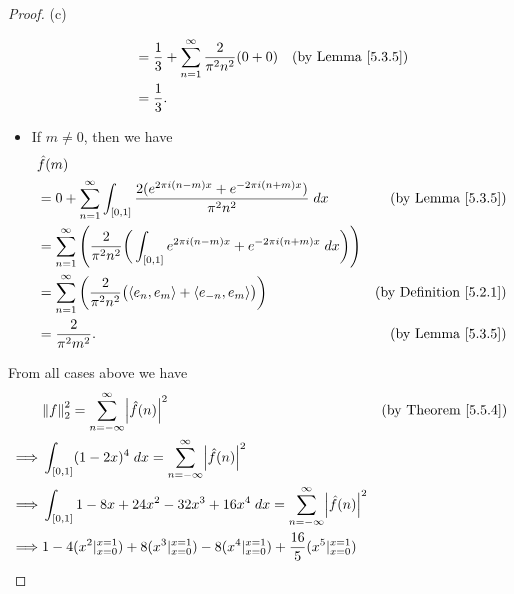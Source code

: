 \begin{proof}{(c)}
\begin{itemize}
\begin{align*}
                             & = \frac{1}{3} + \sum_{n = 1}^\infty \frac{2}{\pi^2 n^2} (0 + 0)                                                                       & \text{(by Lemma \ref{5.3.5})}      \\
                             & = \frac{1}{3}.
              \end{align*}
        \item If \(m \neq 0\), then we have
              \begin{align*}
                   & \hat{f}(m)                                                                                                                                                                 \\
                   & = 0 + \sum_{n = 1}^\infty \int_{[0, 1]} \frac{2 (e^{2 \pi i (n - m) x} + e^{- 2 \pi i (n + m) x})}{\pi^2 n^2} \; dx                   & \text{(by Lemma \ref{5.3.5})}      \\
                   & = \sum_{n = 1}^\infty \Bigg(\frac{2}{\pi^2 n^2} \bigg(\int_{[0, 1]} e^{2 \pi i (n - m) x} + e^{- 2 \pi i (n + m) x} \; dx\bigg)\Bigg)                                      \\
                   & = \sum_{n = 1}^\infty \bigg(\frac{2}{\pi^2 n^2} \big(\inner*{e_n, e_m} + \inner*{e_{-n}, e_m}\big)\bigg)                              & \text{(by Definition \ref{5.2.1})} \\
                   & = \frac{2}{\pi^2 m^2}.                                                                                                                & \text{(by Lemma \ref{5.3.5})}
              \end{align*}
    \end{itemize}
    From all cases above we have
    \begin{align*}
                 & \norm*{f}_2^2 = \sum_{n = -\infty}^\infty \abs*{\hat{f}(n)}^2                                                                      & \text{(by Theorem \ref{5.5.4})} \\
        \implies & \int_{[0, 1]} (1 - 2x)^4 \; dx = \sum_{n = -\infty}^\infty \abs*{\hat{f}(n)}^2                                                                                       \\
        \implies & \int_{[0, 1]} 1 - 8x + 24x^2 - 32x^3 + 16x^4 \; dx = \sum_{n = -\infty}^\infty \abs*{\hat{f}(n)}^2                                                                   \\
        \implies & 1 - 4 (x^2|_{x = 0}^{x = 1}) + 8 (x^3|_{x = 0}^{x = 1}) - 8(x^4|_{x = 0}^{x = 1}) + \frac{16}{5}(x^5|_{x = 0}^{x = 1})                                               \\

\end{align*}
\end{proof}
